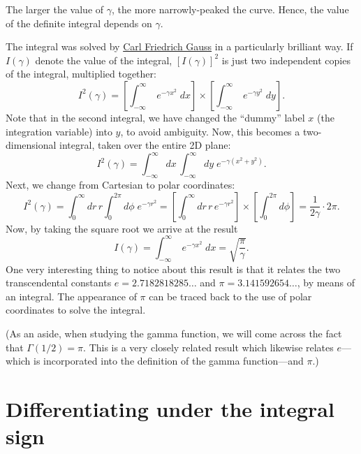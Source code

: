 \documentclass[10pt,a4paper]{article}
\begin{document}
\noindent
The larger the value of $\gamma$, the more narrowly-peaked the curve.
Hence, the value of the definite integral depends on $\gamma$.

The integral was solved by
\href{http://en.wikipedia.org/wiki/Carl_Friedrich_Gauss}{Carl
  Friedrich Gauss} in a particularly brilliant way. If $I(\gamma)$
denote the value of the integral, $[I(\gamma)]^2$ is just two
independent copies of the integral, multiplied together:
\begin{equation}
  I^2(\gamma) = \left[\int_{-\infty}^\infty \; e^{-\gamma x^2} \; dx\right] \times \left[\int_{-\infty}^\infty \; e^{-\gamma y^2} \; dy\right].
\end{equation}
Note that in the second integral, we have changed the ``dummy'' label
$x$ (the integration variable) into $y$, to avoid ambiguity. Now, this
becomes a two-dimensional integral, taken over the entire 2D plane:
\begin{equation}
  I^2(\gamma) = \int_{-\infty}^\infty dx\, \int_{-\infty}^\infty dy \; e^{-\gamma (x^2+y^2)}.
\end{equation}
Next, we change from Cartesian to polar coordinates:
\begin{equation}
  I^2(\gamma) = \int_{0}^\infty dr\, r \int_{0}^{2\pi} d\phi \; e^{-\gamma r^2} = \left[ \int_{0}^\infty dr\, r \, e^{-\gamma r^2}\right] \times \left[\int_{0}^{2\pi} d\phi \right] = \frac{1}{2\gamma} \cdot 2\pi.
\end{equation}
Now, by taking the square root we arrive at the result
\begin{equation}
  I(\gamma) = \int_{-\infty}^\infty \; e^{-\gamma x^2} \; dx = \sqrt{\frac{\pi}{\gamma}}.
\end{equation}
One very interesting thing to notice about this result is that it
relates the two transcendental constants $e = 2.7182818285\dots$ and
$\pi = 3.141592654\dots$, by means of an integral. The appearance of
$\pi$ can be traced back to the use of polar coordinates to solve the
integral.

(As an aside, when studying the gamma function, we will come across
the fact that $\Gamma(1/2) = \pi$.  This is a very closely related
result which likewise relates $e$---which is incorporated into the
definition of the gamma function---and $\pi$.)

\section{Differentiating under the integral sign}
\label{differentiating-under-the-integral-sign}
\end{document}

